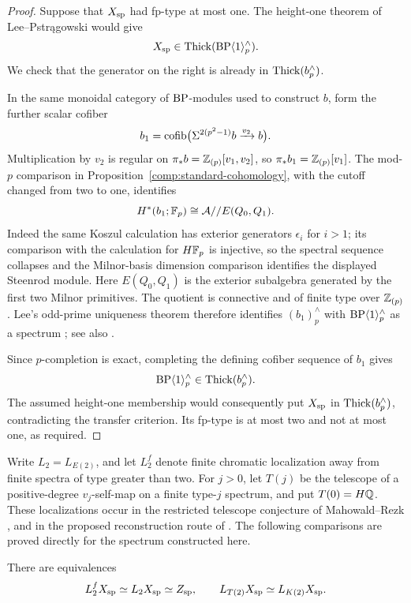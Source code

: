 \begin{proof}
Suppose that \(X_{\rm sp}\) had fp-type at most one.  The height-one
theorem of Lee--Pstr{\k a}gowski
\cite[Theorems~1.3 and~5.4]{LP2026} would give
\[
 X_{\rm sp}\in\operatorname{Thick}(\mathrm{BP}\langle1\rangle_p^\wedge).
\]
We check that the generator on the right is already in
\(\operatorname{Thick}(b_p^\wedge)\).

In the same monoidal category of \(\mathrm{BP}\)-modules used to construct
\(b\), form the further scalar cofiber
\[
 b_1=\operatorname{cofib}\bigl(\Sigma^{2(p^2-1)}b
                  \xrightarrow{v_2}b\bigr).
\]
Multiplication by \(v_2\) is regular on
\(\pi_*b=\mathbb Z_{(p)}[v_1,v_2]\), so
\(\pi_*b_1=\mathbb Z_{(p)}[v_1]\).  The mod-\(p\) comparison in
Proposition~\ref{comp:standard-cohomology}, with the cutoff changed from two to
one, identifies
\[
 H^*(b_1;\mathbb F_p)
   \cong\mathcal A//E(Q_0,Q_1).
\]
Indeed the same Koszul calculation has exterior generators
\(\epsilon_i\) for \(i>1\); its comparison with the calculation for
\(H\mathbb F_p\) is injective, so the spectral sequence collapses and the
Milnor-basis dimension comparison identifies the displayed Steenrod
module.  Here \(E(Q_0,Q_1)\) is the exterior subalgebra generated by the
first two Milnor primitives.  The quotient is connective and of finite
type over \(\mathbb Z_{(p)}\).  Lee's odd-prime uniqueness theorem therefore
identifies \((b_1)_p^\wedge\) with
\(\mathrm{BP}\langle1\rangle_p^\wedge\) as a spectrum
\cite[Theorem~1.1]{Lee2026}; see also \cite[Note~2]{LP2026}.

Since \(p\)-completion is exact, completing the defining cofiber
sequence of \(b_1\) gives
\[
 \mathrm{BP}\langle1\rangle_p^\wedge\in\operatorname{Thick}(b_p^\wedge).
\]
The assumed height-one membership would consequently put
\(X_{\rm sp}\) in \(\operatorname{Thick}(b_p^\wedge)\), contradicting the transfer
criterion.  Its fp-type is at most two and not at most one, as required.
\end{proof}

Write \(L_2=L_{E(2)}\), and let \(L_2^f\) denote finite chromatic
localization away from finite spectra of type greater than two.  For
\(j>0\), let \(T(j)\) be the telescope of a positive-degree
\(v_j\)-self-map on a finite type-\(j\) spectrum, and put
\(T(0)=H\mathbb Q\).  These localizations occur in the restricted telescope
conjecture of Mahowald--Rezk
\cite[Conjecture~7.3]{MR1999}, and in the proposed reconstruction route
of \cite[Conjecture~1.2 and Remark~5.1]{LP2026}.  The following
comparisons are proved directly for the spectrum constructed here.

\begin{proposition}
\label{scope:telescopes}
There are equivalences
\[
 L_2^fX_{\rm sp}\simeq L_2X_{\rm sp}\simeq Z_{\rm sp},
 \qquad
 L_{T(2)}X_{\rm sp}\simeq L_{K(2)}X_{\rm sp}.
\]
\end{proposition}

